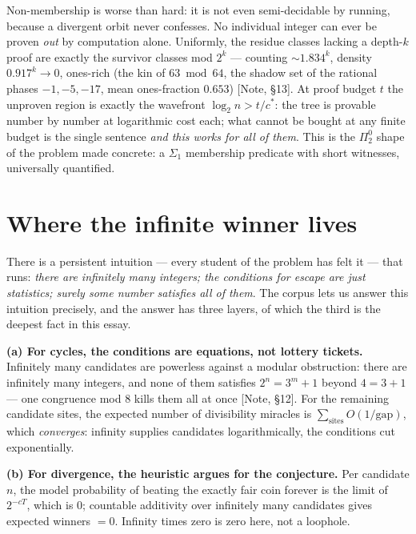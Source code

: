 \documentclass[11pt]{article}
\theoremstyle{definition}
\theoremstyle{remark}
\newcommand{\anchor}[1]{\textup{[#1]}}
\begin{document}
Non-membership is worse than hard: it is not even semi-decidable by running,
because a divergent orbit never confesses. No individual integer can ever be
proven \emph{out} by computation alone. Uniformly, the residue classes
lacking a depth-$k$ proof are exactly the survivor classes mod $2^k$ ---
counting $\sim 1.834^k$, density $0.917^k \to 0$, ones-rich (the kin of $63
\bmod 64$, the shadow set of the rational phases $-1, -5, -17$, mean
ones-fraction $0.653$) \anchor{Note, \S13}. At proof budget $t$ the unproven
region is exactly the wavefront $\log_2 n > t/c^*$: the tree is provable
number by number at logarithmic cost each; what cannot be bought at any
finite budget is the single sentence \emph{and this works for all of them}.
This is the $\Pi^0_2$ shape of the problem \cite{KurtzSimon2007} made
concrete: a $\Sigma_1$ membership predicate with short witnesses, universally
quantified.

\section{Where the infinite winner lives}
\label{sec:winner}

There is a persistent intuition --- every student of the problem has felt it
--- that runs: \emph{there are infinitely many integers; the conditions for
escape are just statistics; surely some number satisfies all of them}. The
corpus lets us answer this intuition precisely, and the answer has three
layers, of which the third is the deepest fact in this essay.

\textbf{(a) For cycles, the conditions are equations, not lottery tickets.}
Infinitely many candidates are powerless against a modular obstruction: there
are infinitely many integers, and none of them satisfies $2^n = 3^m+1$ beyond
$4 = 3+1$ --- one congruence mod $8$ kills them all at once \anchor{Note,
\S12}. For the remaining candidate sites, the expected number of divisibility
miracles is $\sum_{\text{sites}} O(1/\text{gap})$, which \emph{converges}:
infinity supplies candidates logarithmically, the conditions cut
exponentially.

\textbf{(b) For divergence, the heuristic argues for the conjecture.} Per
candidate $n$, the model probability of beating the exactly fair coin forever
is the limit of $2^{-cT}$, which is $0$; countable additivity over infinitely
many candidates gives expected winners $= 0$. Infinity times zero is zero
here, not a loophole.
\end{document}
